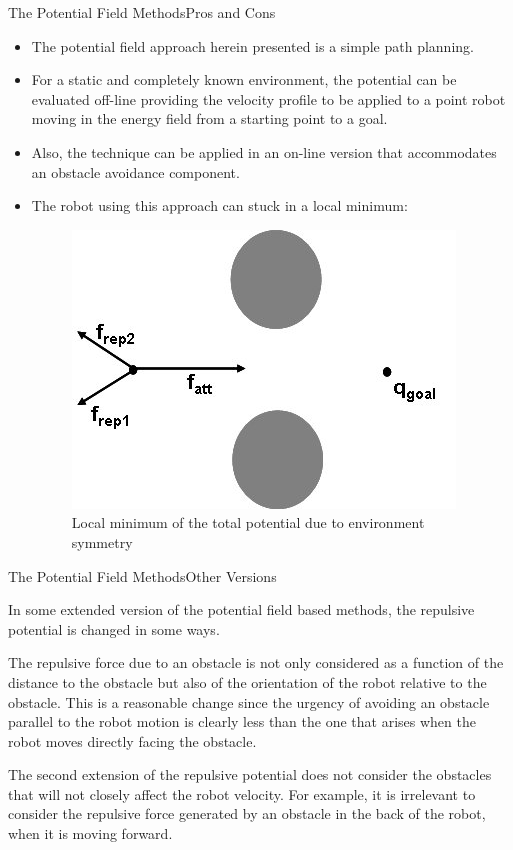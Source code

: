 \documentclass[8pt]{beamer}
\newcommand{\Ytri}{$\triangleright$ }
\renewcommand{\|}[1][.3em]{\hspace{#1}|\hspace{#1}}
\renewcommand{\,}[1][.3em]{,\hspace{#1}}
\newcommand{\subitem}[1]{{\setlength\itemindent{12pt}\item[\Ytri] #1}}
\newcommand{\morespace}{\setlength\itemsep{1em}}
\begin{document}
\begin{frame}{The Potential Field Methods}{Pros and Cons}
\begin{itemize}
\morespace
\item The potential field approach herein presented is a simple path planning.
\item For a static and completely known environment, the potential can be evaluated off-line providing the velocity profile to be applied to a point robot moving in the energy field from a starting point to a goal.
\item Also, the technique can be applied in an on-line version that accommodates an obstacle avoidance component.
\item The robot using this approach can stuck in a local minimum:
\begin{figure}
\centering
\includegraphics[scale=1]{pf_local_min}
\caption{Local minimum of the total potential due to environment symmetry}
\end{figure}
\end{itemize}
\end{frame}
\begin{frame}{The Potential Field Methods}{Other Versions}
\begin{itemize}
\morespace
\item In some extended version of the potential field based methods, the repulsive potential is changed in some ways\cite{khatib1986real,khatib1995extended}.
\subitem{The repulsive force due to an obstacle is not only considered as a function of the distance to the obstacle but also of the orientation of the robot relative to the obstacle. This is a reasonable change since the urgency of avoiding an obstacle parallel to the robot motion is clearly less than the one that arises when the robot moves directly facing the obstacle.}
\subitem{The second extension of the repulsive potential does not consider the obstacles that will not closely affect the robot velocity. For example, it is irrelevant to consider the repulsive force generated by an obstacle in the back of the robot, when it is moving forward.}
\end{itemize}
\end{frame}
\end{document}
